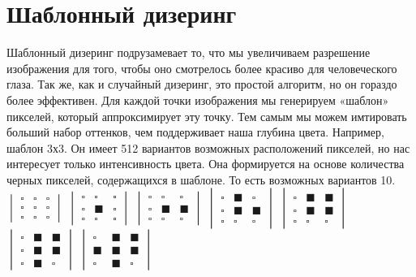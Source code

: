 \section{Шаблонный дизеринг}
Шаблонный дизеринг подрузамевает то, что мы увеличиваем разрешение изображения для того, чтобы оно смотрелось более красиво для человеческого глаза. Так же, как и случайный дизеринг, это простой алгоритм, но он гораздо более эффективен.
Для каждой точки изображения мы генерируем «шаблон» пикселей, который аппроксимирует эту точку. Тем  самым мы можем имтировать больший набор оттенков, чем поддерживает наша глубина цвета.
Например, шаблон 3х3. Он имеет 512 вариантов возможных расположений пикселей, но нас интересует только интенсивность цвета. Она формируется на основе количества черных пикселей, содержащихся в шаблоне. То есть возможных вариантов 10. \\

$\begin{vmatrix}
\square&\square&\square \\
\square &\square&\square \\
\square &\square&\square 
\end{vmatrix}$
$\begin{vmatrix}
\square&\square&\square \\
\square &\blacksquare&\square \\
\square &\square&\square 
\end{vmatrix}$ 
$\begin{vmatrix}
\square&\square&\square \\
\square &\blacksquare&\blacksquare \\
\square &\square&\square 
\end{vmatrix}$ 
$\begin{vmatrix}
\square&\blacksquare&\square \\
\square &\blacksquare&\blacksquare \\
\square &\square&\square 
\end{vmatrix}$ 
$\begin{vmatrix}
\square&\blacksquare&\blacksquare \\
\square &\blacksquare&\blacksquare \\
\square &\square&\square 
\end{vmatrix}$ 
$\begin{vmatrix}
\square&\blacksquare&\blacksquare \\
\square &\blacksquare&\blacksquare \\
\square &\blacksquare&\square 
\end{vmatrix}$ 
$\begin{vmatrix}
\square&\blacksquare&\blacksquare \\
\blacksquare &\blacksquare&\blacksquare \\
\square &\blacksquare&\square 
\end{vmatrix}$ 

